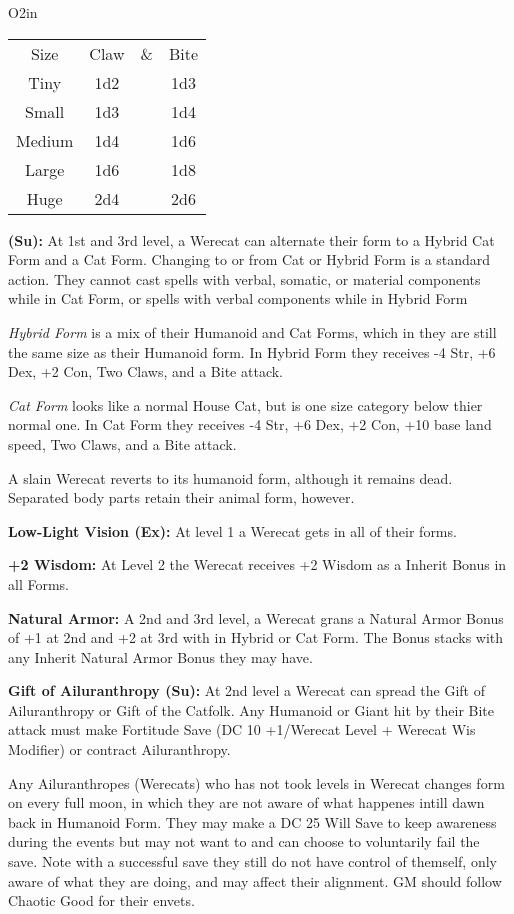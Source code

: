 \setlength{\intextsep}{-5pt}
\begin{wraptable}{O}{2in}
\begin{tabular}{c c c c}
Size & Claw & \& & Bite\\
Tiny & 1d2 && 1d3\\
Small & 1d3 && 1d4\\
Medium & 1d4 && 1d6\\
Large & 1d6 && 1d8\\
Huge & 2d4 && 2d6\\
\end{tabular}
\end{wraptable}

\textbf{ (Su):} At 1st and 3rd level, a Werecat can alternate their form to a Hybrid Cat Form and a Cat Form. Changing to or from Cat or Hybrid Form is a standard action. They cannot cast spells with verbal, somatic, or material components while in Cat Form, or spells with verbal components while in Hybrid Form

\textit{Hybrid Form} is a mix of their Humanoid and Cat Forms, which in they are still the same size as their Humanoid form. In Hybrid Form they receives -4 Str, +6 Dex, +2 Con, Two Claws, and a Bite attack.

\textit{Cat Form} looks like a normal House Cat, but is one size category below thier normal one. In Cat Form they receives -4 Str, +6 Dex, +2 Con, +10 base land speed, Two Claws, and a Bite attack.

A slain Werecat reverts to its humanoid form, although it remains dead. Separated body parts retain their animal form, however.

\textbf{Low-Light Vision (Ex):} At level 1 a Werecat gets  in all of their forms.

\textbf{+2 Wisdom:} At Level 2 the Werecat receives +2 Wisdom as a Inherit Bonus in all Forms.

\textbf{Natural Armor:} A 2nd and 3rd level, a Werecat grans a Natural Armor Bonus of +1 at 2nd and +2 at 3rd with in Hybrid or Cat Form. The Bonus stacks with any Inherit Natural Armor Bonus they may have.

\textbf{Gift of Ailuranthropy (Su):} At 2nd level a Werecat can spread the Gift of Ailuranthropy or Gift of the Catfolk. Any Humanoid or Giant hit by their Bite attack must make Fortitude Save (DC 10 +1/Werecat Level + Werecat Wis Modifier) or contract Ailuranthropy.

Any Ailuranthropes (Werecats) who has not took levels in Werecat changes form on every full moon, in which they are not aware of what happenes intill dawn back in Humanoid Form. They may make a DC 25 Will Save to keep awareness during the events but may not want to and can choose to voluntarily fail the save. Note with a successful save they still do not have control of themself, only aware of what they are doing, and may affect their alignment. GM should follow Chaotic Good for their envets.

